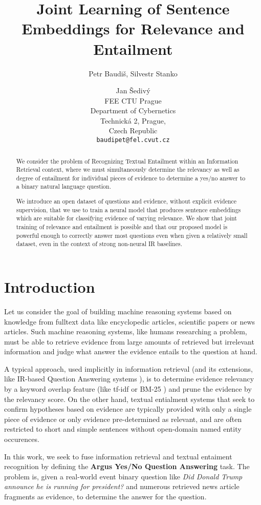 \documentclass[11pt]{article}
\title{Joint Learning of Sentence Embeddings for Relevance and Entailment}
\author{Petr Baudi\v{s},
	Silvestr Stanko \and
	Jan \v{S}ediv\'{y} \\
	FEE CTU Prague\\
	Department of Cybernetics\\
	Technick\'{a} 2, Prague,\\Czech Republic\\
	{\tt baudipet@fel.cvut.cz}}
\date{}
\begin{document}
\maketitle

\begin{abstract}
	We consider the problem of Recognizing Textual Entailment
	within an Information Retrieval context, where we must simultaneously
	determine the relevancy as well as degree of entailment for individual
	pieces of evidence to determine a yes/no answer to a binary
	natural language question.

	We introduce an open dataset of questions and evidence, without
	explicit evidence supervision, that we use to train a neural model
	that produces sentence embeddings which are suitable for classifying
	evidence of varying relevance.  We show that joint training of
	relevance and entailment is possible and that our proposed model
	is powerful enough to correctly answer most questions even when
	given a relatively small dataset, even in the context of
	strong non-neural IR baselines.
\end{abstract}

\section{Introduction}

Let us consider the goal of building machine reasoning systems based
on knowledge from fulltext data like encyclopedic articles, scientific
papers or news articles.
Such machine reasoning systems, like humans researching a problem,
must be able to retrieve evidence from large amounts of retrieved
but irrelevant information and judge what answer the evidence entails
to the question at hand.

A typical approach, used implicitly in information retrieval
(and its extensions, like IR-based Question Answering systems \cite{YodaQAPoster2015}),
is to determine evidence relevancy by a keyword overlap feature (like tf-idf or BM-25 \cite{BM25})
and prune the evidence by the relevancy score.
On the other hand, textual entialment systems that seek to confirm hypotheses
based on evidence \cite{RTE1} \cite{SICK2014} \cite{SNLI}
are typically provided with only a single piece of evidence
or only evidence pre-determined as relevant, and are often restricted
to short and simple sentences without open-domain named entity occurences.

In this work, we seek to fuse information retrieval and textual entaiment
recognition by defining the \textbf{Argus Yes/No Question Answering} task.
The problem is, given a real-world event binary question like
\textit{Did Donald Trump announce he is running for president?}
and numerous retrieved news article fragments as evidence,
to determine the answer for the question.
\end{document}
